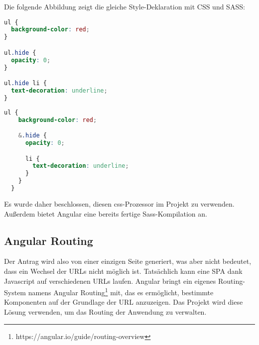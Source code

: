 Die folgende Abbildung zeigt die gleiche Style-Deklaration mit CSS und SASS:\\

\begin{lstlisting}[language=css,caption={Beispiel für die Gestaltung einer Liste mit css},captionpos=b]
ul {
  background-color: red;
}

ul.hide {
  opacity: 0;
}

ul.hide li {
  text-decoration: underline;
}
\end{lstlisting}

\begin{lstlisting}[language=css,caption={Beispiel für die Gestaltung einer Liste mit scss},captionpos=b]
  ul {
    background-color: red;

    &.hide {
      opacity: 0;

      li {
        text-decoration: underline;
      }
    }
  }
\end{lstlisting}


Es wurde daher beschlossen, diesen css-Prozessor im Projekt zu verwenden. Außerdem bietet Angular eine bereits fertige Sass-Kompilation an.

\subsection{Angular Routing}

Der Antrag wird also von einer einzigen Seite generiert, was aber nicht bedeutet, dass ein Wechsel der URLs nicht möglich ist.
Tatsächlich kann eine SPA dank Javascript auf verschiedenen URLs laufen.
Angular bringt ein eigenes Routing-System namens Angular Routing\footnote{https://angular.io/guide/routing-overview} mit, das es ermöglicht, bestimmte Komponenten auf der Grundlage der URL anzuzeigen. Das Projekt wird diese Lösung verwenden, um das Routing der Anwendung zu verwalten.

